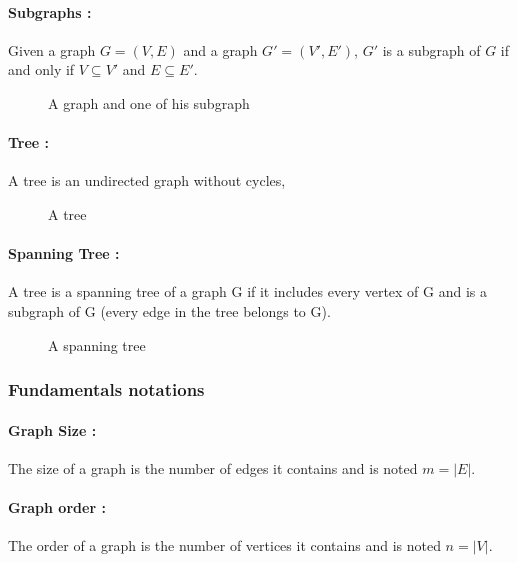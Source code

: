 \paragraph{Subgraphs :}
Given a graph $G = (V,E)$ and a graph $G' = (V',E')$, $G'$ is a subgraph of $G$ if and only if $V \subseteq V'$ and $E \subseteq E'$.

\begin{figure}[!h]
  \begin{center}
    
  \end{center}
  \caption{A graph and one of his subgraph}
\end{figure}

\paragraph{Tree :}
A tree is an undirected graph without cycles,

\begin{figure}[!h]
  \begin{center}
    
  \end{center}
  \caption{A tree}
\end{figure}

\paragraph{Spanning Tree :}
A tree is a spanning tree of a graph G if it includes every vertex of G and is a subgraph of G (every edge in the tree belongs to G).

\begin{figure}[!h]
  \begin{center}
    
  \end{center}
  \caption{A spanning tree}
\end{figure}

\subsubsection{Fundamentals notations}
\paragraph{Graph Size :}
The size of a graph is the number of edges it contains and is noted
$m = |E|$.

\paragraph{Graph order :}
The order of a graph is the number of vertices it contains and is noted
$n = |V|$.

